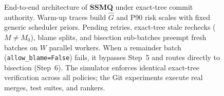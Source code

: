 \begin{figure}[t]
\begin{tikzpicture}
\end{tikzpicture}
\caption{End-to-end architecture of \textbf{SSMQ} under exact-tree commit authority. Warm-up traces build $\hat{G}$ and P90 risk scales with fixed generic scheduler priors. Pending retries, exact-tree stale rechecks ($M \neq M_0$), blame splits, and bisection sub-batches preempt fresh batches on $W$ parallel workers. When a remainder batch (\texttt{allow\_blame=False}) fails, it bypasses Step~5 and routes directly to bisection (Step~6). The simulator enforces identical exact-tree verification across all policies; the Git experiments execute real merges, test suites, and rankers.}
\label{fig:architecture}
\end{figure}
